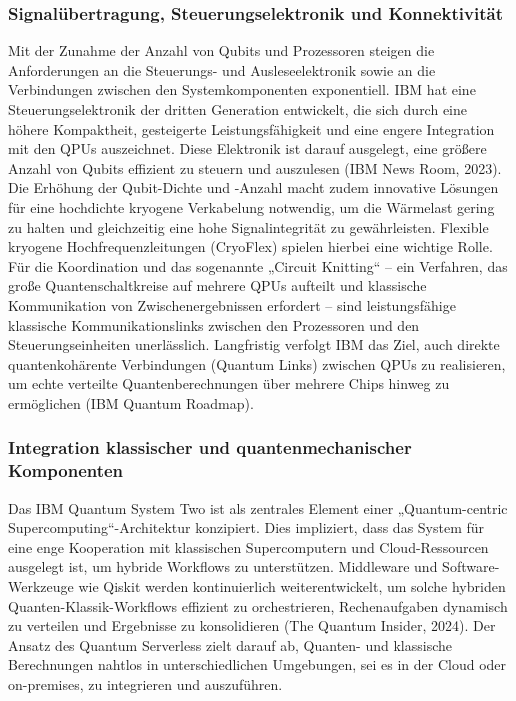 \subsubsection{Signalübertragung, Steuerungselektronik und Konnektivität}
Mit der Zunahme der Anzahl von Qubits und Prozessoren steigen die Anforderungen an die Steuerungs- und Ausleseelektronik sowie an die Verbindungen zwischen den Systemkomponenten exponentiell. IBM hat eine Steuerungselektronik der dritten Generation entwickelt, die sich durch eine höhere Kompaktheit, gesteigerte Leistungsfähigkeit und eine engere Integration mit den QPUs auszeichnet. Diese Elektronik ist darauf ausgelegt, eine größere Anzahl von Qubits effizient zu steuern und auszulesen (IBM News Room, 2023). Die Erhöhung der Qubit-Dichte und -Anzahl macht zudem innovative Lösungen für eine hochdichte kryogene Verkabelung notwendig, um die Wärmelast gering zu halten und gleichzeitig eine hohe Signalintegrität zu gewährleisten. Flexible kryogene Hochfrequenzleitungen (CryoFlex) spielen hierbei eine wichtige Rolle. Für die Koordination und das sogenannte „Circuit Knitting“ – ein Verfahren, das große Quantenschaltkreise auf mehrere QPUs aufteilt und klassische Kommunikation von Zwischenergebnissen erfordert – sind leistungsfähige klassische Kommunikationslinks zwischen den Prozessoren und den Steuerungseinheiten unerlässlich. Langfristig verfolgt IBM das Ziel, auch direkte quantenkohärente Verbindungen (Quantum Links) zwischen QPUs zu realisieren, um echte verteilte Quantenberechnungen über mehrere Chips hinweg zu ermöglichen (IBM Quantum Roadmap).

\subsubsection{Integration klassischer und quantenmechanischer Komponenten}
Das IBM Quantum System Two ist als zentrales Element einer „Quantum-centric Supercomputing“-Architektur konzipiert. Dies impliziert, dass das System für eine enge Kooperation mit klassischen Supercomputern und Cloud-Ressourcen ausgelegt ist, um hybride Workflows zu unterstützen. Middleware und Software-Werkzeuge wie Qiskit werden kontinuierlich weiterentwickelt, um solche hybriden Quanten-Klassik-Workflows effizient zu orchestrieren, Rechenaufgaben dynamisch zu verteilen und Ergebnisse zu konsolidieren (The Quantum Insider, 2024). Der Ansatz des Quantum Serverless zielt darauf ab, Quanten- und klassische Berechnungen nahtlos in unterschiedlichen Umgebungen, sei es in der Cloud oder on-premises, zu integrieren und auszuführen.

